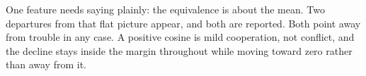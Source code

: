 One feature needs saying plainly: the equivalence is about the mean.
Two departures from that flat picture appear, and both are reported.
Both point away from trouble in any case.
A positive cosine is mild cooperation, not conflict, and the decline stays inside the
margin throughout while moving toward zero rather than away from it.
